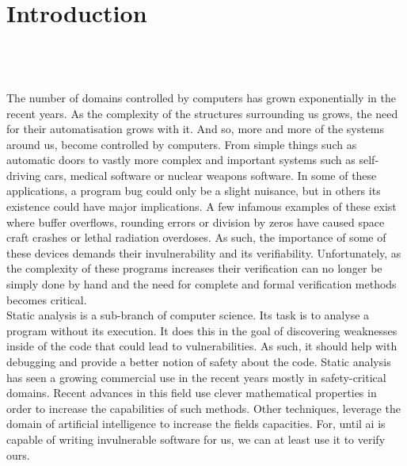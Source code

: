 
\setcounter{chapter}{0}

\chapter{Introduction}
\mbox{}\\
\mbox{}\\
\mbox{}\\
The number of domains controlled by computers has grown exponentially in the recent years. As the complexity of the structures surrounding us grows, the need for their automatisation grows with it. And so, more and more of the systems around us, become controlled by computers. From simple things such as automatic doors to vastly more complex and important systems such as self-driving cars, medical software or nuclear weapons software. In some of these applications, a program bug could only be a slight nuisance, but in others its existence could have major implications. A few infamous examples of these exist where buffer overflows, rounding errors or division by zeros have caused space craft crashes or lethal radiation overdoses. As such, the importance of some of these devices demands their invulnerability and its verifiability. Unfortunately, as the complexity of these programs increases their verification can no longer be simply done by hand and the need for complete and formal verification methods becomes critical.\\
Static analysis is a sub-branch of computer science. Its task is to analyse a program without its execution. It does this in the goal of discovering weaknesses inside of the code that could lead to vulnerabilities. As such, it should help with debugging and provide a better notion of safety about the code. Static analysis has seen a growing commercial use in the recent years mostly in safety-critical domains. Recent advances in this field use clever mathematical properties in order to increase the capabilities of such methods. Other techniques, leverage the domain of artificial intelligence to increase the fields capacities. For, until ai is capable of writing invulnerable software for us, we can at least use it to verify ours.

